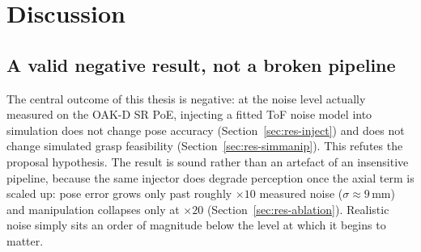 \section{Discussion}\label{sec:discussion}
\subsection{A valid negative result, not a broken pipeline}
The central outcome of this thesis is negative: at the noise level actually measured on the
OAK-D SR PoE, injecting a fitted ToF noise model into simulation does not change pose
accuracy (Section~\ref{sec:res-inject}) and does not change simulated grasp feasibility
(Section~\ref{sec:res-simmanip}). This refutes the proposal hypothesis. The result is sound
rather than an artefact of an insensitive pipeline, because the same injector does degrade
perception once the axial term is scaled up: pose error grows only past roughly $\times10$
measured noise ($\sigma\approx9$\,mm) and manipulation collapses only at $\times20$
(Section~\ref{sec:res-ablation}). Realistic noise simply sits an order of magnitude below
the level at which it begins to matter.

